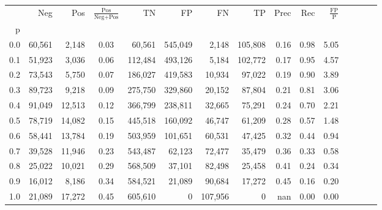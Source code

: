 \begin{tabular}{rrrcrrrrrrrrrrr}
\toprule
{} &     Neg &     Pos & $\frac{\text{Pos}}{\text{Neg}+\text{Pos}}$ &       TN &       FP &       FN &       TP &  Prec &   Rec & $\frac{\text{FP}}{\text{P}}$ \\
p   &         &         &                                            &          &          &          &          &       &       &                              \\
\midrule
0.0 &  60,561 &   2,148 &                                       0.03 &   60,561 &  545,049 &    2,148 &  105,808 &  0.16 &  0.98 &                         5.05 \\
0.1 &  51,923 &   3,036 &                                       0.06 &  112,484 &  493,126 &    5,184 &  102,772 &  0.17 &  0.95 &                         4.57 \\
0.2 &  73,543 &   5,750 &                                       0.07 &  186,027 &  419,583 &   10,934 &   97,022 &  0.19 &  0.90 &                         3.89 \\
0.3 &  89,723 &   9,218 &                                       0.09 &  275,750 &  329,860 &   20,152 &   87,804 &  0.21 &  0.81 &                         3.06 \\
0.4 &  91,049 &  12,513 &                                       0.12 &  366,799 &  238,811 &   32,665 &   75,291 &  0.24 &  0.70 &                         2.21 \\
0.5 &  78,719 &  14,082 &                                       0.15 &  445,518 &  160,092 &   46,747 &   61,209 &  0.28 &  0.57 &                         1.48 \\
0.6 &  58,441 &  13,784 &                                       0.19 &  503,959 &  101,651 &   60,531 &   47,425 &  0.32 &  0.44 &                         0.94 \\
0.7 &  39,528 &  11,946 &                                       0.23 &  543,487 &   62,123 &   72,477 &   35,479 &  0.36 &  0.33 &                         0.58 \\
0.8 &  25,022 &  10,021 &                                       0.29 &  568,509 &   37,101 &   82,498 &   25,458 &  0.41 &  0.24 &                         0.34 \\
0.9 &  16,012 &   8,186 &                                       0.34 &  584,521 &   21,089 &   90,684 &   17,272 &  0.45 &  0.16 &                         0.20 \\
1.0 &  21,089 &  17,272 &                                       0.45 &  605,610 &        0 &  107,956 &        0 &   nan &  0.00 &                         0.00 \\
\bottomrule
\end{tabular}
